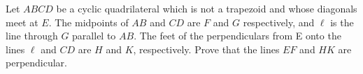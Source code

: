 Let $ABCD$ be a cyclic quadrilateral which is not a trapezoid and whose diagonals meet at $E$. The midpoints of $AB$ and $CD$ are $F$ and $G$ respectively, and $\ell$ is the line through $G$ parallel to $AB$. The feet of the perpendiculars from E onto the lines $\ell$ and $CD$ are $H$ and $K$,  respectively. Prove that the lines $EF$ and $HK$ are perpendicular.